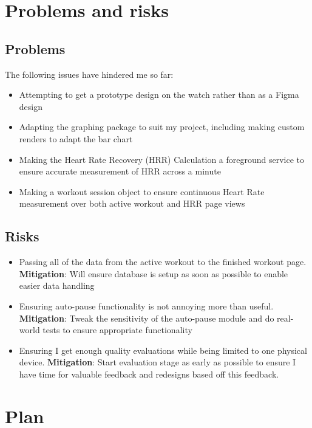 \documentclass[11pt]{article}
\begin{document}
\section{Problems and risks}\label{problems-and-risks}

\subsection{Problems}\label{problems}

The following issues have hindered me so far:

\begin{itemize}
    \item Attempting to get a prototype design on the watch rather than as a Figma design
    \item Adapting the graphing package to suit my project, including making custom renders to adapt the bar chart
    \item Making the Heart Rate Recovery (HRR) Calculation a foreground service to ensure accurate measurement of HRR across a minute
    \item Making a workout session object to ensure continuous Heart Rate measurement over both active workout and HRR page views
    
\end{itemize}

\subsection{Risks}\label{risks}

\begin{itemize}
    \item Passing all of the data from the active workout to the finished workout page. \textbf{Mitigation}: Will ensure database is setup as soon as possible to enable easier data handling
    \item Ensuring auto-pause functionality is not annoying more than useful. \textbf{Mitigation}: Tweak the sensitivity of the auto-pause module and do real-world tests to ensure appropriate functionality
    \item Ensuring I get enough quality evaluations while being limited to one physical device. \textbf{Mitigation}: Start evaluation stage as early as possible to ensure I have time for valuable feedback and redesigns based off this feedback.
\end{itemize}

\section{Plan}\label{plan}
\end{document}
